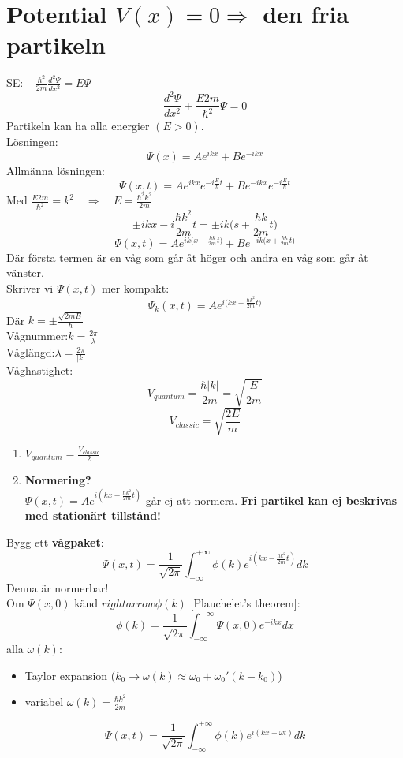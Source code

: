 \documentclass{article}
\begin{document}
\section{Potential $V(x)=0\Rightarrow$ den fria partikeln}
  SE: $-\frac{\hbar^2}{2m}\frac{d^2\Psi}{dx^2}=E\Psi$
  \[
    \frac{d^2\Psi}{dx^2}+\frac{E2m}{\hbar^2}\Psi=0
  \]
  Partikeln kan ha alla energier $(E>0)$.\\
  Lösningen:
  \[
    \Psi(x)=Ae^{ikx}+Be^{-ikx}
  \]
  Allmänna lösningen:
  \[
    \Psi(x,t)=Ae^{ikx}e^{-i\frac{E}{\hbar}t}+Be^{-ikx}e^{-i\frac{E}{\hbar}t}
  \]
  Med $\frac{E2m}{\hbar^2}=k^2\quad\Rightarrow\quad E=\frac{\hbar^2k^2}{2m}$
  \[
    \pm ikx-i\frac{\hbar k^2}{2m}t=\pm ik\big(s\mp\frac{\hbar k}{2m}t\big)
  \]
  \[
    \Psi(x,t)=Ae^{ik\big(x-\frac{\hbar k}{2m}t\big)}+Be^{-ik\big(x+\frac{\hbar k}{2m}t\big)}
  \]
  Där första termen är en våg som går åt höger och andra en våg som går åt vänster.\\
  Skriver vi $\Psi(x,t)$ mer kompakt:
  \[
    \Psi_k(x,t)=Ae^{i\big(kx-\frac{\hbar k^2}{2m}t\big)}
  \]
  Där $k=\pm\frac{\sqrt{2mE}}{\hbar}$\\

  Vågnummer:\quad $k=\frac{2\pi}{\lambda}$\\
  Våglängd:\quad $\lambda=\frac{2\pi}{|k|}$\\
  Våghastighet:
  \[
    V_{quantum}=\frac{\hbar |k|}{2m}=\sqrt{\frac{E}{2m}}
  \]
  \[
    V_{classic}=\sqrt{\frac{2E}{m}}
  \]
  \begin{enumerate}
    \item $V_{quantum}=\frac{V_{classic}}{2}$
    \item \textbf{Normering?}\\
    $\Psi(x,t)=Ae^{i(kx-\frac{\hbar k^2}{2m}t)}$ går ej att normera.
    \textbf{Fri partikel kan ej beskrivas med stationärt tillstånd!}
  \end{enumerate}
  Bygg ett \textbf{vågpaket}:
  \[
    \Psi(x,t)=\frac{1}{\sqrt{2\pi}}\int_{-\infty}^{+\infty}\phi(k)e^{i(kx-\frac{\hbar k^2}{2m}t)}dk
  \]
  Denna är normerbar!\\
  Om $\Psi(x,0)$ känd $rightarrow\phi(k)$ [Plauchelet's theorem]:
  \[
    \phi(k)=\frac{1}{\sqrt{2\pi}}\int_{-\infty}^{+\infty}\Psi(x,0)e^{-ikx}dx
  \]
  alla $\omega(k)$:
  \begin{itemize}
    \item Taylor expansion ($k_0\rightarrow\omega(k)\approx\omega_0+\omega_0'(k-k_0)$)
    \item variabel $\omega(k)=\frac{\hbar k^2}{2m}$
  \end{itemize}
  \[
    \Psi(x,t)=\frac{1}{\sqrt{2\pi}}\int_{-\infty}^{+\infty}\phi(k)e^{i(kx-\omega t)}dk
  \]
\end{document}
